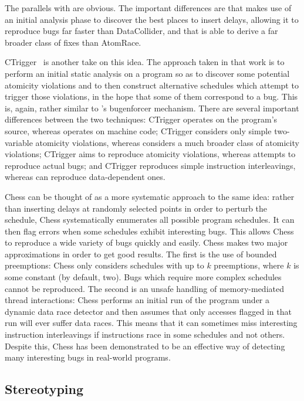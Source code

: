 The parallels with {\technique} are obvious.  The important
differences are that {\technique} makes use of an initial analysis
phase to discover the best places to insert delays, allowing it to
reproduce bugs far faster than DataCollider, and that {\technique}
is able to derive a far broader class of fixes than AtomRace.

CTrigger~\cite{Zhou} is another take on this idea.  The approach taken
in that work is to perform an initial static analysis on a program so
as to discover some potential atomicity violations and to then
construct alternative schedules which attempt to trigger those
violations, in the hope that some of them correspond to a bug.  This
is, again, rather similar to {\technique}'s \gls{bugenforcer}
mechanism.  There are several important differences between the two
techniques: CTrigger operates on the program's source, whereas
{\technique} operates on machine code; CTrigger considers only simple
two-variable atomicity violations, whereas {\technique} considers a
much broader class of atomicity violations; CTrigger aims to reproduce
atomicity violations, whereas {\technique} attempts to reproduce
actual bugs; and CTrigger reproduces simple instruction interleavings,
whereas {\technique} can reproduce data-dependent ones.

Chess\cite{Musuvathi2008} can be thought of as a more systematic
approach to the same idea: rather than inserting delays at randomly
selected points in order to perturb the schedule, Chess systematically
enumerates all possible program schedules.  It can then flag errors
when some schedules exhibit interesting bugs.  This allows Chess to
reproduce a wide variety of bugs quickly and easily.  Chess makes two
major approximations in order to get good results.  The first is the
use of bounded preemptions\cite{Musuvathi2007}: Chess only considers
schedules with up to $k$ preemptions, where $k$ is some constant (by
default, two).  Bugs which require more complex schedules cannot be
reproduced.  The second is an unsafe handling of memory-mediated
thread interactions: Chess performs an initial run of the program
under a dynamic data race detector and then assumes that only accesses
flagged in that run will ever suffer data races.  This means that it
can sometimes miss interesting instruction interleavings if
instructions race in some schedules and not others.  Despite this,
Chess has been demonstrated to be an effective way of detecting many
interesting bugs in real-world programs.

\subsection{Stereotyping}

